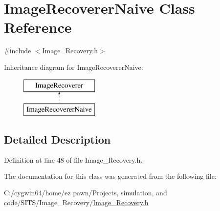 \hypertarget{class_image_recoverer_naive}{}\section{Image\+Recoverer\+Naive Class Reference}
\label{class_image_recoverer_naive}


{\ttfamily \#include $<$Image\+\_\+\+Recovery.\+h$>$}

Inheritance diagram for Image\+Recoverer\+Naive\+:\begin{figure}[H]
\begin{center}
\leavevmode
\includegraphics[height=2.000000cm]{class_image_recoverer_naive}
\end{center}
\end{figure}


\subsection{Detailed Description}


Definition at line 48 of file Image\+\_\+\+Recovery.\+h.



The documentation for this class was generated from the following file\+:\begin{DoxyCompactItemize}
\item 
C\+:/cygwin64/home/ez pawn/\+Projects, simulation, and code/\+S\+I\+T\+S/\+Image\+\_\+\+Recovery/\hyperlink{_image___recovery_8h}{Image\+\_\+\+Recovery.\+h}\end{DoxyCompactItemize}
